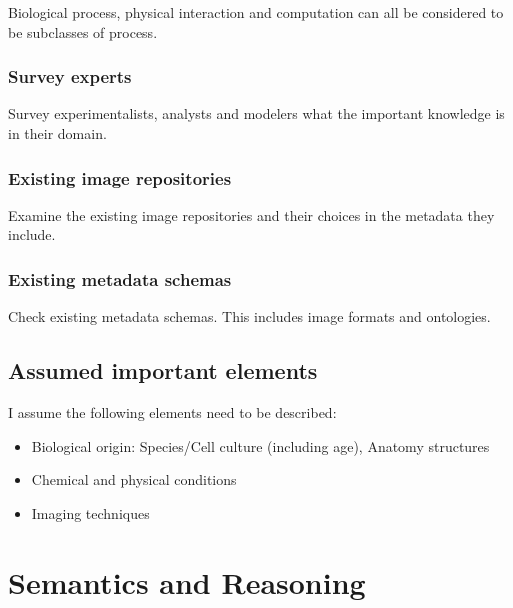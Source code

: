 Biological process, physical interaction and computation can all be
considered to be subclasses of process.

\subsubsection{Survey experts}

Survey experimentalists, analysts and modelers
what the important knowledge is in their domain.

\subsubsection{Existing image repositories}

Examine the existing image repositories and
their choices in the metadata they include.

\subsubsection{Existing metadata schemas}

Check existing metadata schemas. This includes
image formats and ontologies.

\subsection{Assumed important elements}

I assume the following elements need to be described:
\begin{itemize}
\item Biological origin:
  Species/Cell culture (including
  age), Anatomy structures
\item Chemical and physical conditions
\item Imaging techniques
\end{itemize}


\section{Semantics and Reasoning}

